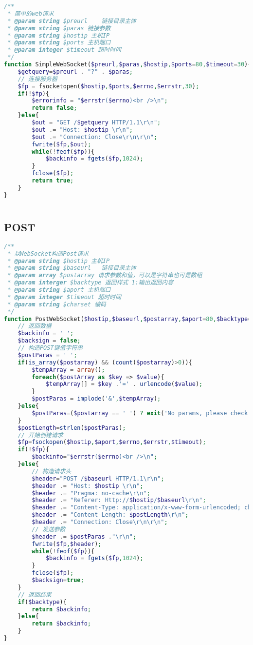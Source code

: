 \begin{lstlisting}[language=PHP]
/**
 * 简单的web请求
 * @param string $preurl	链接目录主体
 * @param string $paras	链接参数
 * @param string $hostip 主机IP
 * @param string $ports 主机端口
 * @param integer $timeout 超时时间
 */
function SimpleWebSocket($preurl,$paras,$hostip,$ports=80,$timeout=30){
	$getquery=$preurl . "?" . $paras;
	// 连接服务器
	$fp = fsocketopen($hostip,$ports,$errno,$errstr,30);
	if(!$fp){
		$errorinfo = "$errstr($errno)<br />\n";
		return false;
	}else{
		$out = "GET /$getquery HTTP/1.1\r\n";
		$out .= "Host: $hostip \r\n";
		$out .= "Connection: Close\r\n\r\n";
		fwrite($fp,$out);
		while(!feof($fp)){
			$backinfo = fgets($fp,1024);
		}
		fclose($fp);
		return true;
	}
}
\end{lstlisting}



\begin{lstlisting}[language=PHP]

\end{lstlisting}

\subsection{POST}


\begin{lstlisting}[language=PHP]
/**
 * 以WebSocket构造Post请求
 * @param string $hostip 主机IP
 * @param string $baseurl	链接目录主体
 * @param array $postarray 请求参数和值，可以是字符串也可是数组
 * @param interger $backtype 返回样式 1:输出返回内容
 * @param string $aport 主机端口
 * @param integer $timeout 超时时间
 * @param string $charset 编码
 */
function PostWebSocket($hostip,$baseurl,$postarray,$aport=80,$backtype=1,$timeout=30,$charset="UTF-8"){
	// 返回数据
	$backinfo = ' ';
	$backsign = false;
	// 构造POST键值字符串
	$postParas = ' ';
	if(is_array($postarray) && (count($postarray)>0)){
		$tempArray = array();
		foreach($postArray as $key => $value){
			$tempArray[] = $key .'=' . urlencode($value);
		}
		$postParas = implode('&',$tempArray);
	}else{
		$postParas=($postarray == ' ') ? exit('No params, please check it...') : $postarray;
	}
	$postLength=strlen($postParas);
	// 开始创建请求
	$fp=fsockopen($hostip,$aport,$errno,$errstr,$timeout);
	if(!$fp){
		$backinfo="$errstr($errno)<br />\n";
	}else{
		// 构造请求头
		$header="POST /$baseurl HTTP/1.1\r\n";
		$header .= "Host: $hostip \r\n";
		$header .= "Pragma: no-cache\r\n";
		$header .= "Referer: Http://$hostip/$baseurl\r\n";
		$header .= "Content-Type: application/x-www-form-urlencoded; charset=$charset\r\n";
		$header .= "Content-Length: $postLength\r\n";
		$header .= "Connection: Close\r\n\r\n";
		// 发送参数
		$header .= $postParas ."\r\n";
		fwrite($fp,$header);
		while(!feof($fp)){
			$backinfo = fgets($fp,1024);
		}
		fclose($fp);
		$backsign=true;
	}
	// 返回结果
	if($backtype){
		return $backinfo;
	}else{
		return $backinfo;
	}
}
\end{lstlisting}




